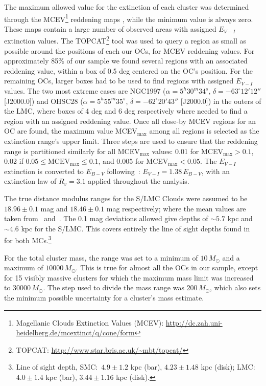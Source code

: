 \documentclass{aa}
\begin{document}
The maximum allowed value for the extinction of each cluster was determined
through the MCEV\footnote{Magellanic Clouds Extinction Values (MCEV):
\url{http://dc.zah.uni-heidelberg.de/mcextinct/q/cone/form}} reddening maps
\citep{Haschke_2011}, while the minimum value is always zero.
%
These maps contain a large number of observed areas with assigned $E_{V-I}$
extinction values.
The TOPCAT\footnote{TOPCAT\@: \url{http://www.star.bris.ac.uk/~mbt/topcat/}}
tool was used to query a region as small as possible around the positions of
each our OCs, for MCEV reddening values.
For approximately 85\% of our sample we found several
regions with an associated reddening value, within a box of 0.5 deg centered on
the OC's position.
For the remaining OCs, larger boxes had to be used to find regions with assigned
$E_{V-I}$ values. The two most extreme cases are NGC1997
($\alpha{=}5^h30^m34^s$, $\delta{=}-63^\circ12'12''$ [J2000.0]) and OHSC28
($\alpha{=}5^h55^m35^s$, $\delta{=}-62^\circ20'43''$ [J2000.0]) in the outers
of the LMC, where boxes of 4 deg and 6 deg respectively where needed to find a
region with an assigned reddening value.
%
Once all close-by MCEV regions for an OC are found, the maximum value
MCEV$_{\max}$ among all regions is selected as the extinction range's upper
limit. Three steps are used to ensure that the reddening range is partitioned
similarly for all MCEV$_{\max}$ values: 0.01 for MCEV$_{\max}{>}0.1$, 0.02 if
$0.05{\leq}\mathrm{MCEV}_{\max}{\leq}0.1$, and 0.005 for MCEV$_{\max}{<}0.05$.
%
The $E_{V-I}$ extinction is converted to $E_{B-V}$
following~\cite{Tammann_2003}: $E_{V-I}{=}1.38\,E_{B-V}$, with an extinction
law of $R_v{=}3.1$ applied throughout the analysis.

The true distance modulus ranges for the S/LMC Clouds were assumed to be
$18.96\pm0.1$ mag and $18.46\pm0.1$ mag respectively; where the mean values
are taken from~\cite{de_Grijs_2015} and~\cite{de_Grijs_2014}.
%
The 0.1 mag deviations allowed give depths of $\sim5.7$ kpc and
$\sim4.6$ kpc for the S/LMC\@. This covers entirely the line of sight
depths found in~\cite{Subramanian_2009} for both MCs.\footnote{Line of sight
depth, SMC:\ $4.9\pm1.2$ kpc (bar), $4.23\pm1.48$ kpc (disk); LMC:\
$4.0\pm1.4$ kpc (bar), $3.44\pm1.16$ kpc (disk).}

For the total cluster mass, the range was set to a minimum of
$10\,M_ {\odot}$ and a maximum of $10000\,M_{\odot}$. This is true for almost
all the OCs in our sample, except for 15 visibly massive clusters for
which the maximum mass limit was increased to $30000\,M_{\odot}$.
The step used to divide the mass range was $200\,M_{\odot}$, which also sets the
minimum possible uncertainty for a cluster's mass estimate.
\end{document}
